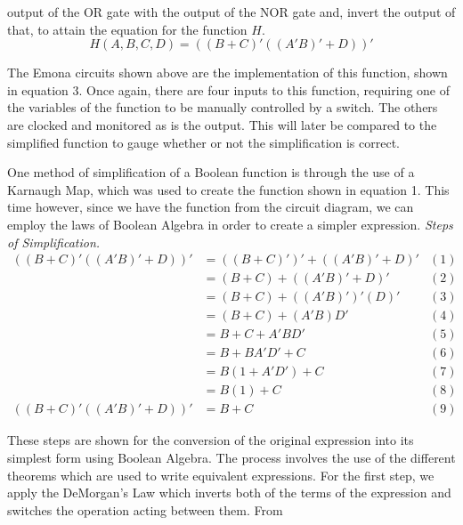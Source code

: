 \documentclass[12pt]{article}
\begin{document}
    output of the OR gate with the output of the NOR gate and, invert the output
    of that, to attain the equation for the function $H$.
    \begin{equation}
        H\left(A,B,C,D\right) = ((B+C)'((A'B)'+D))'
    \end{equation}
    \par The Emona circuits shown above are the implementation of this function,
    shown in equation 3.  Once again, there are four inputs to this function,
    requiring one of the variables of the function to be manually controlled by
    a switch. The others are clocked and monitored as is the output. This will
    later be compared to the simplified function to gauge whether or not the
    simplification is correct.
    \par One method of simplification of a Boolean function is through the use
    of a Karnaugh Map, which was used to create the function shown in equation
    1. This time however, since we have the function from the circuit diagram,
    we can employ the laws of Boolean Algebra in order to create a simpler
    expression.
    \newpage
    \textit{Steps of Simplification.}
    \begin{align*}
        ((B+C)'((A'B)'+D))' & = ((B+C)')'+((A'B)'+D)' & (1) \\
                            & = (B+C)+((A'B)'+D)'     & (2) \\
                            & = (B+C)+((A'B)')'(D)'   & (3) \\
                            & = (B+C)+(A'B)D'         & (4) \\
                            & = B+C+A'BD'             & (5) \\
                            & = B+BA'D'+C             & (6) \\
                            & = B(1+A'D')+C           & (7) \\
                            & = B(1)+C                & (8) \\
        ((B+C)'((A'B)'+D))' & = B+C                   & (9)
    \end{align*}
    \par These steps are shown for the conversion of the original expression
    into its simplest form using Boolean Algebra. The process involves the use
    of the different theorems which are used to write equivalent expressions.
    For the first step, we apply the DeMorgan's Law which inverts both of the
    terms of the expression and switches the operation acting between them. From
\end{document}
